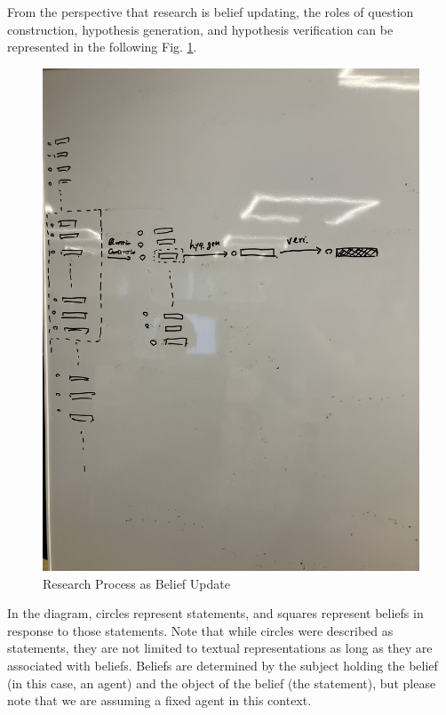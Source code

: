 \documentclass{book}
\begin{document}
From the perspective that research is belief updating, the roles of question construction, hypothesis generation, and hypothesis verification can be represented in the following Fig. \ref{fig:beliefupdate}. 
\begin{figure}[htb]
    \centering
    \includegraphics[width=\textwidth]{figs/beliefupdate.jpg}
    \caption{Research Process as Belief Update}
    \label{fig:beliefupdate}
\end{figure}
In the diagram, circles represent statements, and squares represent beliefs in response to those statements. Note that while circles were described as statements, they are not limited to textual representations as long as they are associated with beliefs. Beliefs are determined by the subject holding the belief (in this case, an agent) and the object of the belief (the statement), but please note that we are assuming a fixed agent in this context.
\end{document}
